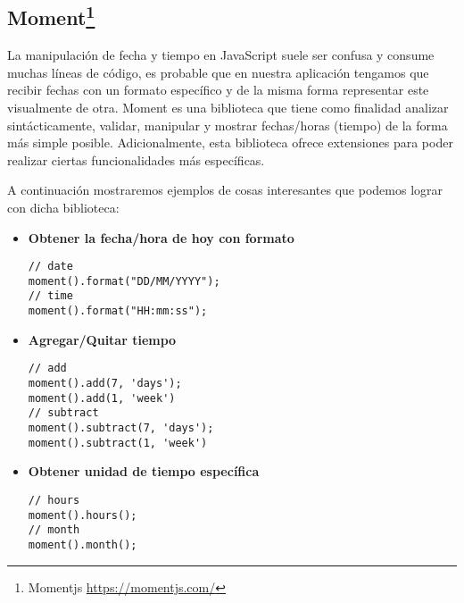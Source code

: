 \subsection[Moment]{Moment\footnote{Momentjs \url{https://momentjs.com/}}}

La manipulación de fecha y tiempo en JavaScript suele ser confusa y consume muchas líneas de código, es probable que en nuestra aplicación tengamos que recibir fechas con un formato específico y de la misma forma representar este visualmente de otra. Moment es una biblioteca que tiene como finalidad analizar sintácticamente, validar, manipular y mostrar fechas/horas (tiempo) de la forma más simple posible. Adicionalmente, esta biblioteca ofrece extensiones para poder realizar ciertas funcionalidades más específicas.

A continuación mostraremos ejemplos de cosas interesantes que podemos lograr con dicha biblioteca:

\begin{itemize}
\item\textbf{Obtener la fecha/hora de hoy con formato}
\begin{lstlisting}
// date
moment().format("DD/MM/YYYY");
// time
moment().format("HH:mm:ss");
\end{lstlisting}

\item\textbf{Agregar/Quitar tiempo}
\begin{lstlisting}
// add
moment().add(7, 'days');
moment().add(1, 'week')
// subtract
moment().subtract(7, 'days');
moment().subtract(1, 'week')
\end{lstlisting}

\item\textbf{Obtener unidad de tiempo específica}
\begin{lstlisting}
// hours
moment().hours();
// month
moment().month();
\end{lstlisting}
\end{itemize}